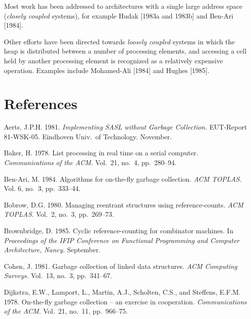    Most work has been addressed to architectures with a single large address
    space (\textit{closely coupled} systems), for example Hudak [1983a and 1983b] and
    Ben-Ari [1984].

    Other efforts have been directed towards \textit{loosely coupled} systems in which
    the heap is distributed between a number of processing elements, and
    accessing a cell held by another processing element is recognized as a
    relatively expensive operation. Examples include Mohamed-Ali [1984] and
    Hughes [1985].

    \section*{References}

    \begin{references}

        \item Aerts, J.P.H. 1981. \textit{Implementing SASL without Garbage Collection.} EUT-Report
        81-WSK-05. Eindhoven Univ.\ of Technology. November.

        \item Baker, H. 1978. List processing in real time on a serial computer. \textit{Communications of
            the ACM.} Vol.~21, no.~4, pp.~280--94.

        \item Ben-Ari, M. 1984. Algorithms for on-the-fly garbage collection. \textit{ACM TOPLAS.} Vol.
        6, no.~3, pp.~333--44.

        \item Bobrow, D.G. 1980. Managing reentrant structures using reference-counts. \textit{ACM
            TOPLAS.} Vol.~2, no.~3, pp.~269--73.

        \item Brownbridge, D. 1985. Cyclic reference-counting for combinator machines. In
        \textit{Proceedings of the IFIP Conference on Functional Programming and Computer
            Architecture, Nancy.} September.

        \item Cohen, J. 1981. Garbage collection of linked data structures. \textit{ACM Computing Surveys.}
        Vol.~13, no.~3, pp.~341--67.

        \item Dijkstra, E.W., Lamport, L., Martin, A.J., Scholten, C.S., and Steffens, E.F.M.
        1978. On-the-fly garbage collection -- an exercise in cooperation. \textit{Communications
            of the ACM.} Vol.~21, no.~11, pp.~966--75.


\end{references}
